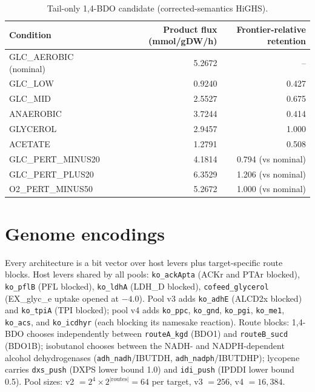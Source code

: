 \documentclass[12pt,a4paper]{article}
\begin{document}
\begin{table}[h]
\centering
\small
\caption{Tail-only 1,4-BDO candidate (corrected-semantics HiGHS).}
\label{tab:tailonly}
\begin{tabular}{l r r}
\hline
Condition & Product flux (mmol/gDW/h) & Frontier-relative retention \\
\hline
GLC\_AEROBIC (nominal) & 5.2672 & -- \\
GLC\_LOW & 0.9240 & 0.427 \\
GLC\_MID & 2.5527 & 0.675 \\
ANAEROBIC & 3.7244 & 0.414 \\
GLYCEROL & 2.9457 & 1.000 \\
ACETATE & 1.2791 & 0.508 \\
GLC\_PERT\_MINUS20 & 4.1814 & 0.794 (vs nominal) \\
GLC\_PERT\_PLUS20 & 6.3529 & 1.206 (vs nominal) \\
O2\_PERT\_MINUS50 & 5.2672 & 1.000 (vs nominal) \\
\hline
\end{tabular}
\end{table}

\section{Genome encodings}
Every architecture is a bit vector over host levers plus target-specific route blocks. Host levers shared by all pools: \texttt{ko\_ackApta} (ACKr and PTAr blocked), \texttt{ko\_pflB} (PFL blocked), \texttt{ko\_ldhA} (LDH\_D blocked), \texttt{cofeed\_glycerol} (EX\_glyc\_e uptake opened at $-4.0$). Pool v3 adds \texttt{ko\_adhE} (ALCD2x blocked) and \texttt{ko\_tpiA} (TPI blocked); pool v4 adds \texttt{ko\_ppc}, \texttt{ko\_gnd}, \texttt{ko\_pgi}, \texttt{ko\_me1}, \texttt{ko\_acs}, and \texttt{ko\_icdhyr} (each blocking its namesake reaction). Route blocks: 1,4-BDO chooses independently between \texttt{routeA\_kgd} (BDO1) and \texttt{routeB\_sucd} (BDO1B); isobutanol chooses between the NADH- and NADPH-dependent alcohol dehydrogenases (\texttt{adh\_nadh}/IBUTDH, \texttt{adh\_nadph}/IBUTDHP); lycopene carries \texttt{dxs\_push} (DXPS lower bound 1.0) and \texttt{idi\_push} (IPDDI lower bound 0.5). Pool sizes: v2 $=2^4\times2^{|\mathrm{routes}|}=64$ per target, v3 $=256$, v4 $=16{,}384$.
\end{document}
